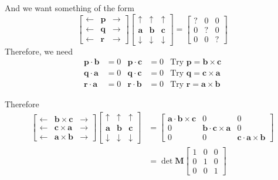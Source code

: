 \documentclass[11pt, a4paper]{article}
\begin{document}
And we want something of the form
\begin{equation*}
\begin{bmatrix} \leftarrow & \boldsymbol{p} & \rightarrow \\ \leftarrow & \boldsymbol{q} & \rightarrow \\ \leftarrow & \boldsymbol{r} & \rightarrow \end{bmatrix}\begin{bmatrix} \uparrow & \uparrow & \uparrow \\ \boldsymbol{a} & \boldsymbol{b} & \boldsymbol{c} \\ \downarrow & \downarrow & \downarrow \end{bmatrix}=\begin{bmatrix} ? & 0 & 0 \\ 0 & ? & 0 \\ 0 & 0 & ? \end{bmatrix}
\end{equation*}
Therefore, we need 
\begin{align*}
\boldsymbol{p}\cdot\boldsymbol{b}&=0 & \boldsymbol{p}\cdot\boldsymbol{c}&=0 & \text{Try }\boldsymbol{p}=\boldsymbol{b}\times\boldsymbol{c}\\
\boldsymbol{q}\cdot\boldsymbol{a}&=0 & \boldsymbol{q}\cdot\boldsymbol{c}&=0 & \text{Try }\boldsymbol{q}=\boldsymbol{c}\times\boldsymbol{a}\\
\boldsymbol{r}\cdot\boldsymbol{a}&=0 & \boldsymbol{r}\cdot\boldsymbol{b}&=0 & \text{Try }\boldsymbol{r}=\boldsymbol{a}\times\boldsymbol{b}
\end{align*}

Therefore
\begin{align*}
\begin{bmatrix} \leftarrow & \boldsymbol{b}\times\boldsymbol{c} & \rightarrow \\ \leftarrow & \boldsymbol{c}\times\boldsymbol{a} & \rightarrow \\ \leftarrow & \boldsymbol{a}\times\boldsymbol{b} & \rightarrow \end{bmatrix}\begin{bmatrix} \uparrow & \uparrow & \uparrow \\ \boldsymbol{a} & \boldsymbol{b} & \boldsymbol{c} \\ \downarrow & \downarrow & \downarrow \end{bmatrix}&=\begin{bmatrix} \boldsymbol{a}\cdot\boldsymbol{b}\times\boldsymbol{c} & 0 & 0 \\ 0 & \boldsymbol{b}\cdot\boldsymbol{c}\times\boldsymbol{a} & 0 \\ 0 & 0 & \boldsymbol{c}\cdot\boldsymbol{a}\times\boldsymbol{b} \end{bmatrix}\\
&=\det\boldsymbol{M}\begin{bmatrix}1&0&0\\0&1&0\\0&0&1\end{bmatrix}
\end{align*}
\end{document}
